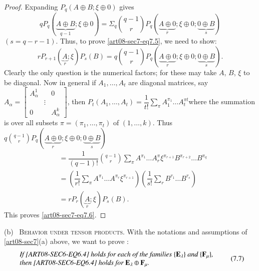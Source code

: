 \begin{proof}
Expanding $P_{q}(A\oplus B;\xi\oplus 0)$ gives
$$
qP_{q}(\underbrace{A\oplus B}_{q-1};\xi\oplus 0)=\Sigma_{q}\binom{q-1}{r}P_{q}(\underbrace{A\oplus 0}_{r};\xi\oplus 0;\underbrace{0\oplus B}_{s})
$$
$(s=q-r-1)$. Thus, to prove \eqref{art08-sec7-eq7.5}, we need to show:
\begin{equation*}
rP_{r+1}(\underbrace{A}_{r};\xi)P_{s}(B)=q\binom{q-1}{r}P_{q}(\underbrace{A\oplus 0}_{r};\xi\oplus 0; \underbrace{0\oplus B}_{s}).\tag{7.6}\label{art08-sec7-eq7.6}
\end{equation*}
Clearly the only question is the numerical factors; for these may take $A$, $B$, $\xi$ to be diagonal. Now in general if $A_{1},\ldots,A_{t}$ are diagonal matrices, say $A_{\alpha}=\left[\begin{smallmatrix} A^{1}_{\alpha} & & 0\\ & \vdots & \\ 0 & & A^{k}_{\alpha}\end{smallmatrix}\right]$, then $P_{t}(A_{1},\ldots,A_{t})=\dfrac{1}{t!}\sum\limits_{\pi}A^{\pi_{1}}_{1}\ldots A^{\pi t}_{t}$\pageoriginale where the summation is over all subsets $\pi=(\pi_{1},\ldots,\pi_{t})$ of $(1,\ldots,k)$. Thus $q\binom{q-1}{r}P_{q}(\underbrace{A\oplus 0}_{r};\xi\oplus 0; \underbrace{0\oplus B}_{s})$
\begin{align*}
&= \dfrac{1}{(q-1)!}\binom{q-1}{r}\sum\limits_{\pi}A^{\pi_{1}}\ldots A^{\pi}_{r}\xi^{\pi_{r+1}}B^{\pi_{r+2}}\ldots B^{\pi_{q}}\\[3pt]
&= \left(\dfrac{1}{r!}\sum\limits_{\pi}A^{\pi_{1}}\ldots A^{\pi_{r}}\xi^{\pi_{r+1}}\right)\left(\dfrac{1}{s!}\sum\limits_{r}B^{\tau_{1}}\ldots B^{\tau_{s}}\right)\\[3pt]
&= rP_{r}(\underbrace{A}_{r};\xi)P_{s}(B).
\end{align*}
This proves \eqref{art08-sec7-eq7.6}.
\end{proof}

(b)~ \textsc{Behavior under tensor products.} With the notations and assumptions of \ref{art08-sec7}(a) above, we want to prove :
\begin{equation*}
\begin{array}{l}
\text{\em If \eqref{ART08-SEC6-EQ6.4} holds for each of the families $\{\mathbf{E}_{\lambda}\}$ and $\{\mathbf{F}_{\mu}\}$,}\\
\text{\em then \eqref{ART08-SEC6-EQ6.4} holds for $\mathbf{E}_{\lambda}\oplus \mathbf{F}_{\mu}$.}
\end{array}\tag{7.7}\label{art08-sec7-eq7.7}
\end{equation*}

